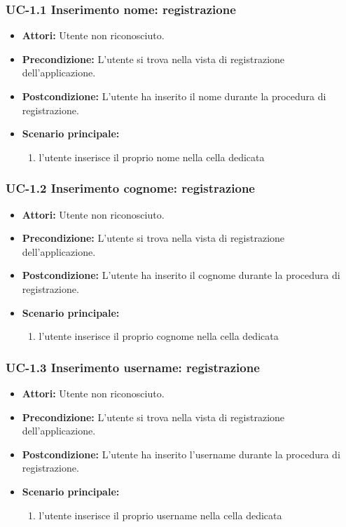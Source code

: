 \subsubsection{UC-1.1 Inserimento nome: registrazione}
\begin{itemize}
	\item \textbf{Attori: }Utente non riconosciuto.
	\item \textbf{Precondizione: }L'utente si trova nella vista 		di registrazione dell'applicazione.
	\item \textbf{Postcondizione: }L'utente ha inserito il nome durante la procedura di registrazione.
	\item \textbf{Scenario principale: }
	\begin{enumerate}
		\item l'utente inserisce il proprio nome nella cella 				dedicata
	\end{enumerate}
\end{itemize}

\subsubsection{UC-1.2 Inserimento cognome: registrazione}
\begin{itemize}
	\item \textbf{Attori: }Utente non riconosciuto.
	\item \textbf{Precondizione: }L'utente si trova nella vista 		di registrazione dell'applicazione.
	\item \textbf{Postcondizione: }L'utente ha inserito il cognome durante la procedura di registrazione.
	\item \textbf{Scenario principale: }
	\begin{enumerate}
		\item l'utente inserisce il proprio cognome nella cella 				dedicata
	\end{enumerate}
\end{itemize}

\subsubsection{UC-1.3 Inserimento username: registrazione}
\begin{itemize}
	\item \textbf{Attori: }Utente non riconosciuto.
	\item \textbf{Precondizione: }L'utente si trova nella vista 		di registrazione dell'applicazione.
	\item \textbf{Postcondizione: }L'utente ha inserito l'username durante la procedura di registrazione.
	\item \textbf{Scenario principale: }
	\begin{enumerate}
		\item l'utente inserisce il proprio username nella cella dedicata
	\end{enumerate}
\end{itemize}

